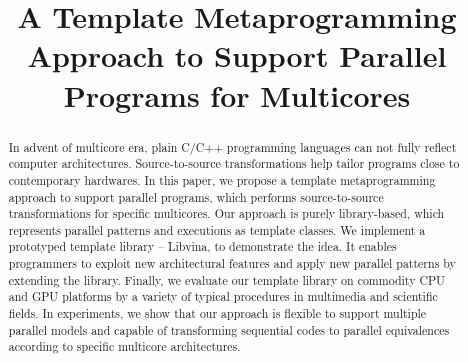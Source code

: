 \documentclass[10pt, conference, paperletter]{IEEEtran}
\begin{document}
\title{A Template Metaprogramming Approach to Support Parallel
  Programs for Multicores}


\author{
}
\maketitle


\begin{abstract}
In advent of multicore era, plain C/C++ programming languages can not
fully reflect computer architectures. Source-to-source
transformations help tailor programs close to contemporary
hardwares. In this paper, we propose a template metaprogramming
approach to support parallel programs, which performs
source-to-source transformations for specific
multicores. Our approach is purely library-based, which represents
parallel patterns and executions as template classes. We implement a prototyped
template library -- Libvina, to demonstrate the idea. It enables
programmers to exploit new architectural
features and apply new parallel patterns by extending the library. 
Finally, we evaluate our template library on
commodity CPU and GPU platforms by a variety of typical procedures
in multimedia and scientific fields. In experiments, we show that our
approach is flexible to support multiple parallel models and capable
of transforming sequential codes to parallel equivalences according to
specific multicore architectures. 
\end{abstract}

\IEEEpeerreviewmaketitle



%






%


\end{document}

